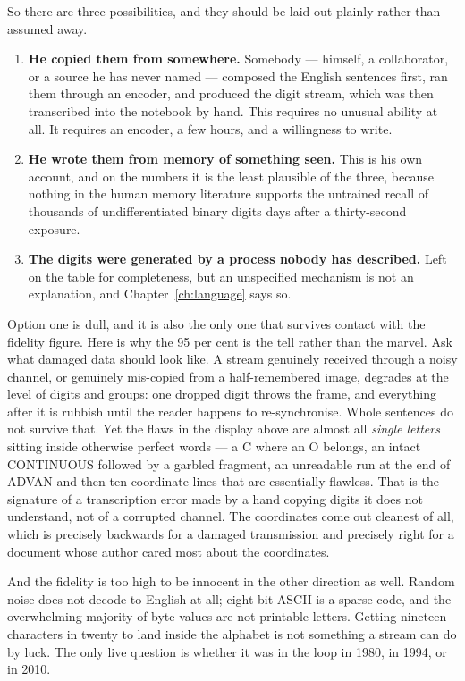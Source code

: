 So there are three possibilities, and they should be laid out plainly rather than assumed away.

\begin{enumerate}\setlength{\itemsep}{2pt}
\item \textbf{He copied them from somewhere.} Somebody --- himself, a collaborator, or a source
he has never named --- composed the English sentences first, ran them through an encoder, and
produced the digit stream, which was then transcribed into the notebook by hand. This requires
no unusual ability at all. It requires an encoder, a few hours, and a willingness to write.
\item \textbf{He wrote them from memory of something seen.} This is his own account, and on the
numbers it is the least plausible of the three, because nothing in the human memory literature
supports the untrained recall of thousands of undifferentiated binary digits days after a
thirty-second exposure.
\item \textbf{The digits were generated by a process nobody has described.} Left on the table
for completeness, but an unspecified mechanism is not an explanation, and
Chapter~\ref{ch:language} says so.
\end{enumerate}

Option one is dull, and it is also the only one that survives contact with the fidelity figure.
Here is why the 95 per cent is the tell rather than the marvel. Ask what damaged data should
look like. A stream genuinely received through a noisy channel, or genuinely mis-copied from a
half-remembered image, degrades at the level of digits and groups: one dropped digit throws the
frame, and everything after it is rubbish until the reader happens to re-synchronise. Whole
sentences do not survive that. Yet the flaws in the display above are almost all
\emph{single letters} sitting inside otherwise perfect words --- a C where an O belongs, an
intact CONTINUOUS followed by a garbled fragment, an unreadable run at the end of ADVAN and
then ten coordinate lines that are essentially flawless. That is the signature of a transcription
error made by a hand copying digits it does not understand, not of a corrupted channel. The
coordinates come out cleanest of all, which is precisely backwards for a damaged transmission
and precisely right for a document whose author cared most about the coordinates.

And the fidelity is too high to be innocent in the other direction as well. Random noise does
not decode to English at all; eight-bit ASCII is a sparse code, and the overwhelming majority
of byte values are not printable letters. Getting nineteen characters in twenty to land inside
the alphabet is not something a stream can do by luck.  The only live question is whether it was in the loop in 1980, in
1994, or in 2010.

